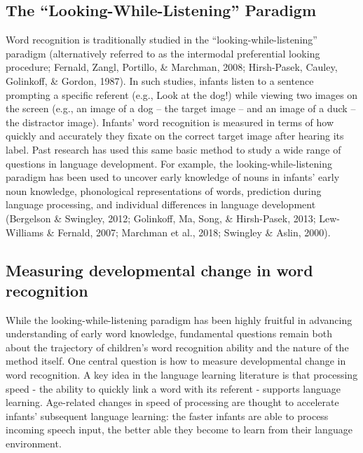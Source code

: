 \documentclass[
  english,
  man,floatsintext]{apa6}
\begin{document}
\hypertarget{the-looking-while-listening-paradigm}{%
\subsection{\texorpdfstring{The \enquote{Looking-While-Listening} Paradigm}{The ``Looking-While-Listening'' Paradigm}}\label{the-looking-while-listening-paradigm}}

Word recognition is traditionally studied in the \enquote{looking-while-listening} paradigm (alternatively referred to as the intermodal preferential looking procedure; Fernald, Zangl, Portillo, \& Marchman, 2008; Hirsh-Pasek, Cauley, Golinkoff, \& Gordon, 1987).
In such studies, infants listen to a sentence prompting a specific referent (e.g., Look at the dog!) while viewing two images on the screen (e.g., an image of a dog -- the target image -- and an image of a duck -- the distractor image).
Infants' word recognition is measured in terms of how quickly and accurately they fixate on the correct target image after hearing its label.
Past research has used this same basic method to study a wide range of questions in language development.
For example, the looking-while-listening paradigm has been used to uncover early knowledge of nouns in infants' early noun knowledge, phonological representations of words, prediction during language processing, and individual differences in language development (Bergelson \& Swingley, 2012; Golinkoff, Ma, Song, \& Hirsh-Pasek, 2013; Lew-Williams \& Fernald, 2007; Marchman et al., 2018; Swingley \& Aslin, 2000).

\hypertarget{measuring-developmental-change-in-word-recognition}{%
\subsection{Measuring developmental change in word recognition}\label{measuring-developmental-change-in-word-recognition}}

While the looking-while-listening paradigm has been highly fruitful in advancing understanding of early word knowledge, fundamental questions remain both about the trajectory of children's word recognition ability and the nature of the method itself.
One central question is how to measure developmental change in word recognition.
A key idea in the language learning literature is that processing speed - the ability to quickly link a word with its referent - supports language learning.
Age-related changes in speed of processing are thought to accelerate infants' subsequent language learning: the faster infants are able to process incoming speech input, the better able they become to learn from their language environment.
\end{document}
